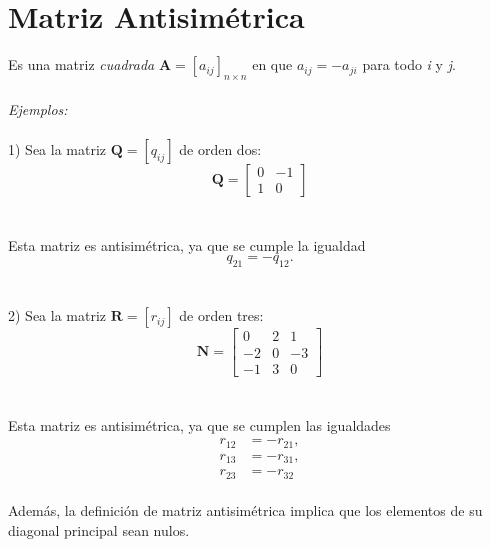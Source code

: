 \documentclass[a4paper,12pt]{report} %
\begin{document}
\section{Matriz Antisimétrica}
Es una matriz \textit{cuadrada} \(\mathbf{A} = \left[\mathit{a_{ij}}\right]_\mathit{n\times n}\) en que \(\mathit{a_{ij}} = \mathit{-a_{ji}}\) para todo \textit{i} y \textit{j}.
\\ \\
\textit{Ejemplos:} \\ \\
1) Sea la matriz \(\mathbf{Q} = \left[\mathit{q_{ij}}\right]\) de orden dos:
\[
\mathbf{Q} = \begin{bmatrix}
    0 & -1\\
    1 & 0
\end{bmatrix}
\]\\ \\
Esta matriz es antisimétrica, ya que se cumple la igualdad 
\[\mathit{q_{21}} = \mathit{-q_{12}}.\] \\ \\
2) Sea la matriz \(\mathbf{R} = \left[\mathit{r_{ij}}\right]\) de orden tres:
\[
\mathbf{N} = \begin{bmatrix}
    0 & 2 & 1\\
    -2 & 0 & -3\\
    -1 & 3 & 0
\end{bmatrix}
\]\\ \\
Esta matriz es antisimétrica, ya que se cumplen las igualdades
\[
\begin{matrix}
\mathit{r_{12}} &= \mathit{-r_{21}},\\
\mathit{r_{13}} & = \mathit{-r_{31}},\\
\mathit{r_{23}} & = \mathit{-r_{32}}
\end{matrix}
\]
\\
Además, la definición de matriz antisimétrica implica que los elementos de su diagonal principal sean nulos.
\end{document}
